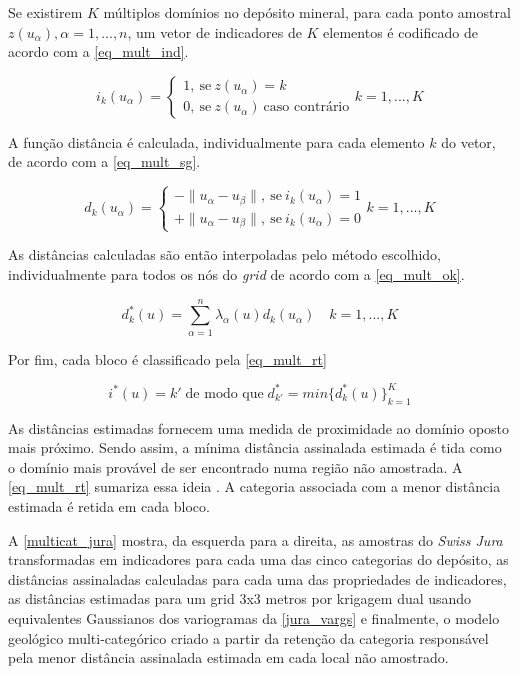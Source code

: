 Se existirem $K$ múltiplos domínios no depósito mineral, para cada ponto amostral ${z(u_\alpha),\alpha=1,...,n}$, um vetor de indicadores de $K$ elementos é codificado de acordo com a \autoref{eq_mult_ind}.

\begin{equation}
	i_k(u_\alpha)=\begin{cases}
	1,\:\textrm{se}\:z(u_\alpha)=k\\
    0,\:\textrm{se}\:z(u_\alpha)\:\textrm{caso contrário}\end{cases} k=1,...,K
    \label{eq_mult_ind}
\end{equation}

A função distância é calculada, individualmente para cada elemento $k$ do vetor, de acordo com a \autoref{eq_mult_sg}.

\begin{equation}
	d_k(u_\alpha)=\begin{cases}
	-\parallel u_\alpha-u_\beta\parallel,\:\textrm{se}\:i_k(u_\alpha)=1\\
	+\parallel u_\alpha-u_\beta\parallel,\:\textrm{se}\:i_k(u_\alpha)=0\end{cases} k=1,...,K
    \label{eq_mult_sg}
\end{equation}

As distâncias calculadas são então interpoladas pelo método escolhido, individualmente para todos os nós do \textit{grid} de acordo com a \autoref{eq_mult_ok}.

\begin{equation}
	d_k^*(u)=\sum\limits_{\alpha=1}^n \lambda_\alpha(u)d_k(u_\alpha)\quad k=1,...,K
    \label{eq_mult_ok}
\end{equation}

Por fim, cada bloco é  classificado pela \autoref{eq_mult_rt}

\begin{equation}
	i^*(u)=k'\;\text{de modo que}\;d_{k'}^*=min\{d_k^*(u)\}_{k=1}^K
    \label{eq_mult_rt}
\end{equation}

As distâncias estimadas fornecem uma medida de proximidade ao domínio oposto mais próximo. Sendo assim, a mínima distância assinalada estimada é tida como o domínio mais provável de ser encontrado numa região não amostrada. A \autoref{eq_mult_rt} sumariza essa ideia \cite{silvaenhancedgeomodeling}. A categoria associada com a menor distância estimada é retida em cada bloco.

A \autoref{multicat_jura} mostra, da esquerda para a direita, as amostras do \textit{Swiss Jura} transformadas em indicadores para cada uma das cinco categorias do depósito, as distâncias assinaladas calculadas para cada uma das propriedades de indicadores, as distâncias estimadas para um grid 3x3 metros por krigagem dual usando equivalentes Gaussianos dos variogramas da \autoref{jura_vargs} e finalmente, o modelo geológico multi-categórico criado a partir da retenção da categoria responsável pela menor distância assinalada estimada em cada local não amostrado. 

